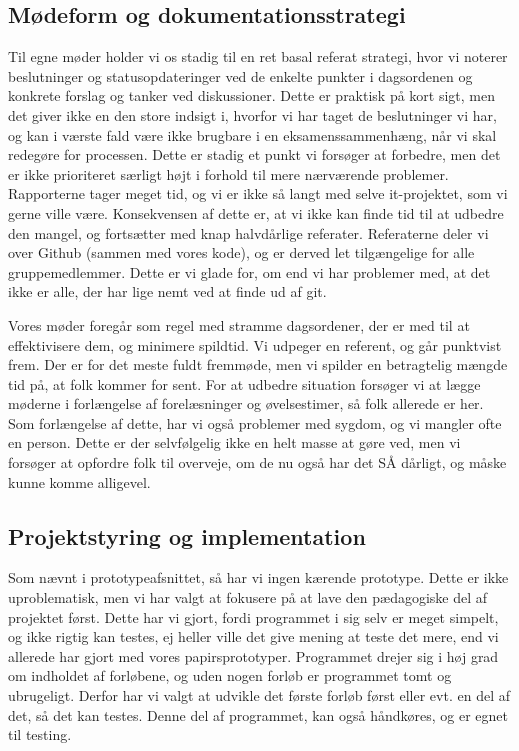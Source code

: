 \documentclass[10pt,a4paper,danish]{article}
\begin{document}
\subsection{Mødeform og dokumentationsstrategi} 
Til egne møder holder vi os stadig til en ret basal referat strategi, hvor vi noterer beslutninger og statusopdateringer ved de enkelte punkter i dagsordenen og konkrete forslag og tanker ved diskussioner. Dette er praktisk på kort sigt, men det giver ikke en den store indsigt i, hvorfor vi har taget de beslutninger vi har, og kan i værste fald være ikke brugbare i en eksamenssammenhæng, når vi skal redegøre for processen. Dette er stadig et punkt vi forsøger at forbedre, men det er ikke prioriteret særligt højt i forhold til mere nærværende problemer. Rapporterne tager meget tid, og vi er ikke så langt med selve it-projektet, som vi gerne ville være. Konsekvensen af dette er, at vi ikke kan finde tid til at udbedre den mangel, og fortsætter med knap halvdårlige referater. Referaterne deler vi over Github (sammen med vores kode), og er derved let tilgængelige for alle gruppemedlemmer. Dette er vi glade for, om end vi har problemer med, at det ikke er alle, der har lige nemt ved at finde ud af git.

Vores møder foregår som regel med stramme dagsordener, der er med til at effektivisere dem, og minimere spildtid. Vi udpeger en referent, og går punktvist frem. Der er for det meste fuldt fremmøde, men vi spilder en betragtelig mængde tid på, at folk kommer for sent. For at udbedre situation forsøger vi at lægge møderne i forlængelse af forelæsninger og øvelsestimer, så folk allerede er her. Som forlængelse af dette, har vi også problemer med sygdom, og vi mangler ofte en person. Dette er der selvfølgelig ikke en helt masse at gøre ved, men vi forsøger at opfordre folk til overveje, om de nu også har det SÅ dårligt, og måske kunne komme alligevel.


\subsection{Projektstyring og implementation}
Som nævnt i prototypeafsnittet, så har vi ingen kærende prototype. Dette er ikke uproblematisk, men vi har valgt at fokusere på at lave den pædagogiske del af projektet først. Dette har vi gjort, fordi programmet i sig selv er meget simpelt, og ikke rigtig kan testes, ej heller ville det give mening at teste det mere, end vi allerede har gjort med vores papirsprototyper. Programmet drejer sig i høj grad om indholdet af forløbene, og uden nogen forløb er programmet tomt og ubrugeligt. Derfor har vi valgt at udvikle det første forløb først eller evt. en del af det, så det kan testes. Denne del af programmet, kan også håndkøres, og er egnet til testing.
\end{document}
